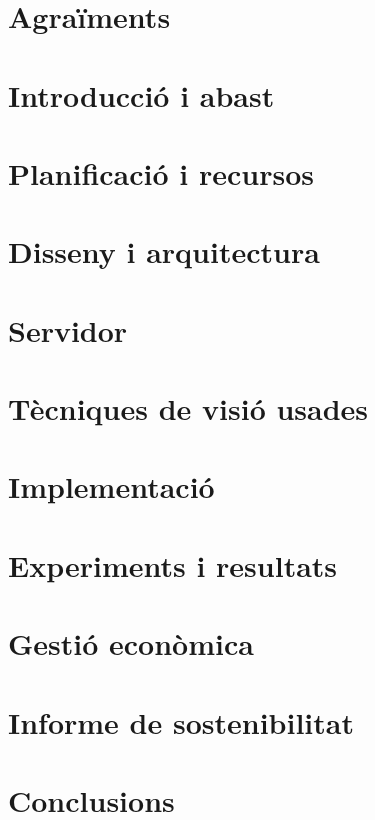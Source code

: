 \documentclass[a4paper,12pt]{report}
\begin{document}
	\chapter*{Agraïments}
	

	\tableofcontents
	\chapter{Introducció i abast}
	
	\chapter{Planificació i recursos}
	
	\chapter{Disseny i arquitectura}
	
	\chapter{Servidor}
	
	\chapter{Tècniques de visió usades}
	
	\chapter{Implementació}
	
	\chapter{Experiments i resultats}
	
	\chapter{Gestió econòmica}
	
	\chapter{Informe de sostenibilitat}
	
	\chapter{Conclusions}
	

%		

	\printbibliography[heading=bibintoc]
	\cleardoublepage{}
	\listoftables
	\cleardoublepage{}
	\listoffigures
\end{document}
